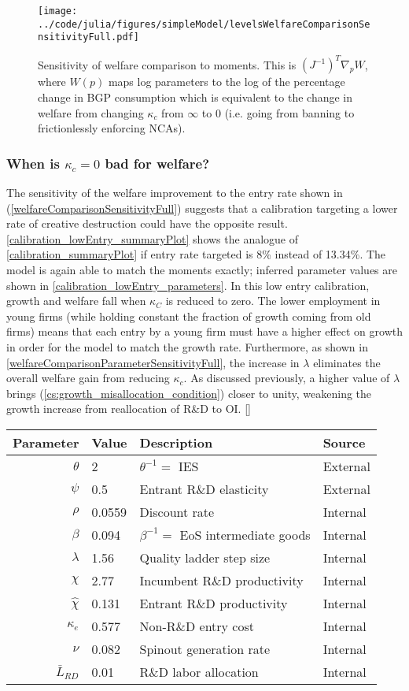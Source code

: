 \documentclass[11pt,english]{article}
\theoremstyle{definition}
\begin{document}
\begin{figure}[]
	\centering
	\texttt{[image: ../code/julia/figures/simpleModel/levelsWelfareComparisonSensitivityFull.pdf]}
	\caption{Sensitivity of welfare comparison to moments. This is $(J^{-1})^T \nabla_p W$, where $W(p)$ maps log parameters to the log of the percentage change in BGP consumption which is equivalent to the change in welfare from changing $\kappa_c$ from $\infty$ to $0$ (i.e. going from banning to frictionlessly enforcing NCAs).}
	\label{levelsWelfareComparisonSensitivityFull}
\end{figure}


\subsubsection{When is $\kappa_c = 0$ bad for welfare?}

The sensitivity of the welfare improvement to the entry rate shown in (\ref{welfareComparisonSensitivityFull}) suggests that a calibration targeting a lower rate of creative destruction could have the opposite result. \autoref{calibration_lowEntry_summaryPlot} shows the analogue of \autoref{calibration_summaryPlot} if entry rate targeted is 8\% instead of 13.34\%. The model is again able to match the moments exactly; inferred parameter values are shown in \autoref{calibration_lowEntry_parameters}. In this low entry calibration, growth and welfare fall when $\kappa_C$ is reduced to zero. The lower employment in young firms (while holding constant the fraction of growth coming from old firms) means that each entry by a young firm must have a higher effect on growth in order for the model to match the growth rate. Furthermore, as shown in \autoref{welfareComparisonParameterSensitivityFull}, the increase in $\lambda$ eliminates the overall welfare gain from reducing $\kappa_c$. As discussed previously, a higher value of $\lambda$ brings (\ref{cs:growth_misallocation_condition}) closer to unity, weakening the growth increase from reallocation of R\&D to OI. \autoref{}

\begin{table}[]
	\centering
	\label{calibration_lowEntry_parameters}
	\begin{tabular}{rlll}
		\toprule \toprule
		Parameter & Value & Description & Source \tabularnewline
		\midrule
		$\theta$ & 2 & $\theta^{-1} = $ IES & External 
		\tabularnewline
		$\psi$ & 0.5 & Entrant R\&D elasticity & External \tabularnewline
		$\rho$ & 0.0559 & Discount rate  & Internal \tabularnewline
		$\beta$ & 0.094 & $\beta^{-1} = $ EoS intermediate goods & Internal \tabularnewline 
		$\lambda$ & 1.56 & Quality ladder step size & Internal 
		\tabularnewline
		$\chi$ & 2.77 & Incumbent R\&D productivity & Internal 
		\tabularnewline
		$\hat{\chi}$ & 0.131 & Entrant R\&D productivity & Internal \tabularnewline 
		$\kappa_e$ & 0.577 & Non-R\&D entry cost & Internal \tabularnewline
		$\nu$ & 0.082 & Spinout generation rate  & Internal\tabularnewline
		$\bar{L}_{RD}$ & 0.01 & R\&D labor allocation  & Internal \tabularnewline
		\bottomrule
	\end{tabular}
\end{table}
\end{document}
